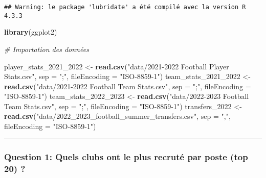\documentclass[
]{article}
\newenvironment{Shaded}{\begin{snugshade}}{\end{snugshade}}
\newcommand{\AttributeTok}[1]{\textcolor[rgb]{0.13,0.29,0.53}{#1}}
\newcommand{\CommentTok}[1]{\textcolor[rgb]{0.56,0.35,0.01}{\textit{#1}}}
\newcommand{\FunctionTok}[1]{\textcolor[rgb]{0.13,0.29,0.53}{\textbf{#1}}}
\newcommand{\NormalTok}[1]{#1}
\newcommand{\OtherTok}[1]{\textcolor[rgb]{0.56,0.35,0.01}{#1}}
\newcommand{\StringTok}[1]{\textcolor[rgb]{0.31,0.60,0.02}{#1}}
\begin{document}
\begin{verbatim}
## Warning: le package 'lubridate' a été compilé avec la version R 4.3.3
\end{verbatim}

\begin{Shaded}
\begin{Highlighting}[]
\FunctionTok{library}\NormalTok{(ggplot2)}
\end{Highlighting}
\end{Shaded}

\begin{Shaded}
\begin{Highlighting}[]
\CommentTok{\# Importation des données}

\NormalTok{player\_stats\_2021\_2022 }\OtherTok{\textless{}{-}} \FunctionTok{read.csv}\NormalTok{(}\StringTok{"data/2021{-}2022 Football Player Stats.csv"}\NormalTok{, }\AttributeTok{sep =} \StringTok{";"}\NormalTok{, }\AttributeTok{fileEncoding =} \StringTok{"ISO{-}8859{-}1"}\NormalTok{)}
\NormalTok{team\_stats\_2021\_2022 }\OtherTok{\textless{}{-}} \FunctionTok{read.csv}\NormalTok{(}\StringTok{"data/2021{-}2022 Football Team Stats.csv"}\NormalTok{, }\AttributeTok{sep =} \StringTok{";"}\NormalTok{, }\AttributeTok{fileEncoding =} \StringTok{"ISO{-}8859{-}1"}\NormalTok{)}
\NormalTok{team\_stats\_2022\_2023 }\OtherTok{\textless{}{-}} \FunctionTok{read.csv}\NormalTok{(}\StringTok{"data/2022{-}2023 Football Team Stats.csv"}\NormalTok{, }\AttributeTok{sep =} \StringTok{";"}\NormalTok{, }\AttributeTok{fileEncoding =} \StringTok{"ISO{-}8859{-}1"}\NormalTok{)}
\NormalTok{transfers\_2022 }\OtherTok{\textless{}{-}} \FunctionTok{read.csv}\NormalTok{(}\StringTok{"data/2022\_2023\_football\_summer\_transfers.csv"}\NormalTok{, }\AttributeTok{sep =} \StringTok{","}\NormalTok{, }\AttributeTok{fileEncoding =} \StringTok{"ISO{-}8859{-}1"}\NormalTok{)}
\end{Highlighting}
\end{Shaded}

\begin{center}\rule{0.5\linewidth}{0.5pt}\end{center}

\subsubsection{\texorpdfstring{\textbf{Question 1:} Quels clubs ont le
plus recruté par poste (top 20)
?}{Question 1: Quels clubs ont le plus recruté par poste (top 20) ?}}\label{question-1-quels-clubs-ont-le-plus-recrutuxe9-par-poste-top-20}
\end{document}
